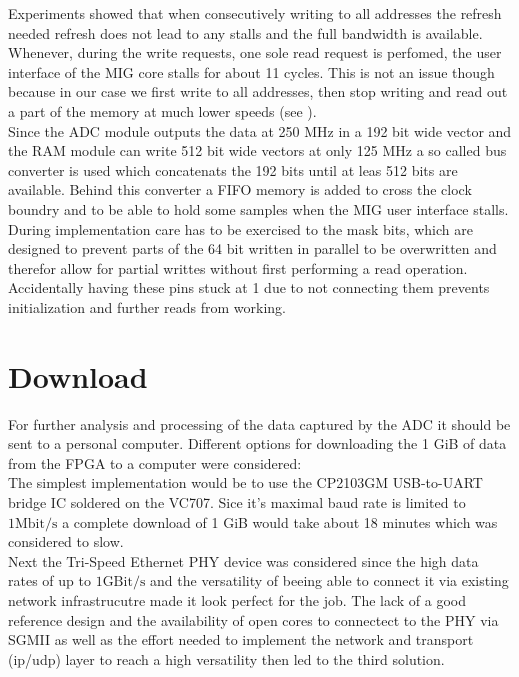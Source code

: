 Experiments showed that when consecutively writing to all addresses the
refresh needed refresh does not lead to any stalls and the full bandwidth
is available. Whenever, during the write requests, one sole read request
is perfomed, the user interface of the \gls{MIG} core stalls for about 11
cycles. This is not an issue though because in our case we first write
to all addresses, then stop writing and read out a part of the memory
at much lower speeds (see ). \\

Since the \gls{ADC} module outputs the data at 250 MHz in a 192 bit
wide vector and the \gls{RAM} module can write 512 bit wide vectors
at only 125 MHz a so called bus converter is used which concatenats
the 192 bits until at leas 512 bits are available. Behind this converter
a \gls{FIFO} memory is added to cross the clock boundry and to be able
to hold some samples when the \gls{MIG} user interface stalls. \\

During implementation care has to be exercised to the mask bits,
which are designed to prevent parts of the 64 bit written in parallel to be
overwritten and therefor allow for partial writtes without first performing
a read operation. Accidentally having these pins stuck at 1 due to
not connecting them prevents initialization and further reads from
working. \\

\section{Download}
\label{sec:fpga_download}
For further analysis and processing of the data captured by the \gls{ADC}
it should be sent to a personal computer.
Different options for downloading the 1 GiB of data from the \gls{FPGA}
to a computer were considered: \\

The simplest implementation would be to use
the CP2103GM USB-to-UART bridge IC soldered on the VC707. Sice it's
maximal baud rate is limited to $1 \text{Mbit}/\text{s}$ a complete
download of 1 GiB would take about 18 minutes which was considered to slow. \\

Next the Tri-Speed Ethernet \acrshort{PHY} device was considered since
the high data rates of up to $1 \text{GBit}/\text{s}$ and the versatility
of beeing able to connect it via existing network infrastrucutre made
it look perfect for the job. The lack of a good reference design and the
availability of open cores to connectect to the \gls{PHY} via 
\acrshort{SGMII} as well as the effort needed to implement
the network and transport (ip/udp) layer to reach a high
versatility then led to the third solution. \\

